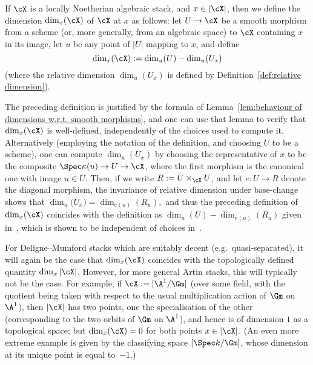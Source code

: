\begin{adf}
\label{def:dimension for stacks}
If $\cX$ is a locally Noetherian algebraic stack,
and $x \in |\cX|$, then we  define the dimension $\dim_x(\cX)$
of $\cX$ at $x$ as follows:
let $U \to \cX$ be a smooth morphism 
from a scheme (or, more generally, from an algebraic space) to $\cX$
containing $x$ in its image,
let $u$ be any point of $|U|$ mapping to $x$,
and define
$$\dim_x(\cX) :=  \dim_u (U) - \dim_{u}( U_x)$$
(where the relative dimension $\dim_u(U_x)$ is defined
by Definition~\ref{def:relative dimension}).
\end{adf}

\begin{aremark}
	\label{rem:computing dims}
The preceding definition is justified by the formula of
Lemma~\ref{lem:behaviour of dimensions w.r.t. smooth morphisms},
and one can use that lemma to verify that $\dim_x(\cX)$ is well-defined,
independently of the choices used to compute it.
Alternatively (employing the notation of the definition, and choosing 
$U$ to be a scheme),
one can compute $\dim_u(U_x)$ by choosing
the representative of $x$ to  be the composite
$\Spec \kappa(u) \to U \to \cX$, where the first morphism is the canonical
one with image $u \in U$. 
Then, if we write $R := U\times_{\cX} U$, and let $e: U \to R$ denote the
diagonal morphism, the invariance of relative dimension under base-change
shows that $\dim_u \bigl(U_x) = \dim_{e(u)}(R_u),$
and thus the preceding definition of $\dim_x (\cX)$ coincides
with the definition as $\dim_u (U) - \dim_{e(u)}(R_u)$ given
in~\cite[\href{http://stacks.math.columbia.edu/tag/0AFN}{Def.~0AFN}]
{stacks-project}, 
which is shown to be independent of choices 
in~\cite[\href{http://stacks.math.columbia.edu/tag/0AFM}{Lem.~0AFM}]
{stacks-project}. 
\end{aremark}

\begin{aremark}
For Deligne--Mumford stacks which are suitably decent
(e.g.\ quasi-separated),
it will again be the case that $\dim_x(\cX)$ coincides with the topologically
defined quantity $\dim_x |\cX|$.  However, for more general Artin stacks, 
this will typically not be the case.  For example, if $\cX := [\A^1/\Gm]$
(over some field, with the quotient being taken with
respect to the usual multiplication action of $\Gm$ on $\A^1$),
then  $|\cX|$ has two points, one the specialisation of the other (corresponding
to the two orbits of $\Gm$ on $\A^1$), and hence is of dimension $1$ as
a topological space; but $\dim_x (\cX) = 0$ for both points $x \in |\cX|$.
(An even more extreme example is given by the classifying space 
$[\Spec k/\Gm]$, whose dimension at its unique point
is equal to~$-1$.)
\end{aremark}

